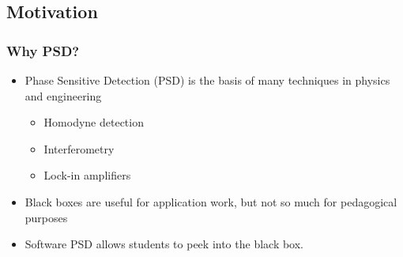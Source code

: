 \documentclass{beamer}
\begin{document}
\subsection{Motivation}
\begin{frame}
\frametitle{Why PSD?}
\begin{itemize}%
\item{Phase Sensitive Detection (PSD) is the basis of many techniques in physics and engineering}
\begin{itemize}
\item{Homodyne detection}
\item{Interferometry}
\item{Lock-in amplifiers}

\end{itemize}

\item {Black boxes are useful for application work, but not so much for pedagogical purposes}
\item {Software PSD allows students to peek into the black box.}


\end{itemize}

\end{frame}
\end{document}

